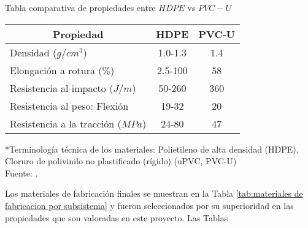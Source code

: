 \begin{mytable}[H]
	\centering
	\caption{Tabla comparativa de propiedades entre $HDPE$ vs $PVC-U$}
	\label{tab:tabla comparativa de propiedades entre hdpe vs pvcu}
	\begin{tabular}{|l|c|c|}
		\hline
		\multicolumn{1}{|c|}{\textbf{Propiedad}} & \textbf{HDPE} & \textbf{PVC-U} \\ \hline
		Densidad ($g/cm^3$) & 1.0-1.3 & 1.4 \\ \hline
		Elongación a rotura ($\%$) & 2.5-100 & 58 \\ \hline
		Resistencia al impacto ($J/m$) & 50-260 & 360 \\ \hline
		Resistencia al peso: Flexión & 19-32 & 20 \\ \hline
		Resistencia a la tracción ($MPa$) & 24-80 & 47 \\ \hline
	\end{tabular}
	\begin{flushleft}
		*Terminología técnica de los materiales: Polietileno de alta densidad (HDPE), Cloruro de polivinilo no plastificado (rígido) (uPVC, PVC-U)\\		
		Fuente: \cite{MakeItFrom2020}.
	\end{flushleft}
\end{mytable}


Los materiales de fabricación finales se muestran en la Tabla \ref{tab:materiales de fabricacion por subsistema} y fueron seleccionados por su superioridad en las propiedades que son valoradas en este proyecto. Las Tablas 

